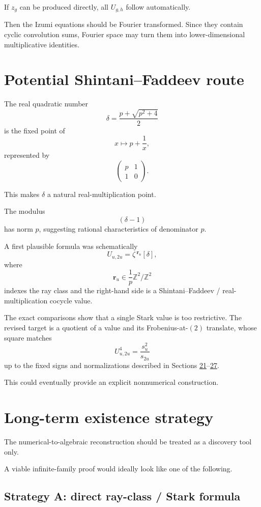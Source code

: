 \documentclass[11pt,reqno]{amsart}
\theoremstyle{plain}
\begin{document}
If \(z_g\) can be produced directly, all \(U_{g,h}\) follow automatically.

Then the Izumi equations should be Fourier transformed. Since they contain cyclic convolution sums, Fourier space may turn them into lower-dimensional multiplicative identities.

\section{Potential Shintani--Faddeev route}\label{sec:16}

The real quadratic number
\[
\delta=\frac{p+\sqrt{p^2+4}}2
\]
is the fixed point of
\[
x\mapsto p+\frac1x,
\]
represented by
\[
\begin{pmatrix}
p&1\\
1&0
\end{pmatrix}.
\]

This makes \(\delta\) a natural real-multiplication point.

The modulus
\[
(\delta-1)
\]
has norm \(p\), suggesting rational characteristics of denominator \(p\).

A first plausible formula was schematically
\[
U_{u,2u}
=
\zeta\,
{}^{\mathbf r_u}[\delta],
\]
where
\[
\mathbf r_u\in \frac1p\mathbb Z^2/\mathbb Z^2
\]
indexes the ray class and the right-hand side is a Shintani--Faddeev / real-multiplication cocycle value.

The exact comparisons show that a single Stark value is too restrictive. The revised target is a quotient of a value and its Frobenius-at-\((2)\) translate, whose square matches
\[
U_{u,2u}^4
=
\frac{s_u^2}{s_{2u}}
\]
up to the fixed signs and normalizations described in Sections \hyperref[sec:21]{21}--\hyperref[sec:27]{27}.

This could eventually provide an explicit nonnumerical construction.

\section{Long-term existence strategy}\label{sec:17}

The numerical-to-algebraic reconstruction should be treated as a discovery tool only.

A viable infinite-family proof would ideally look like one of the following.

\subsection{Strategy A: direct ray-class / Stark formula}\label{sec:17.1}
\end{document}
